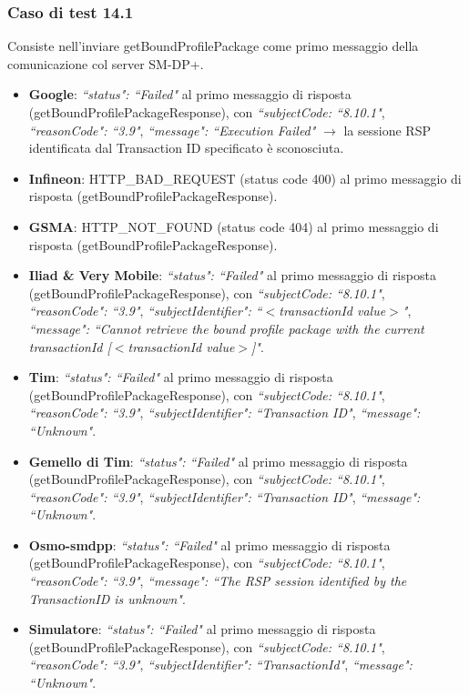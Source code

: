 \documentclass[10pt, oneside]{book}
\begin{document}
\subsubsection{Caso di test 14.1}
Consiste nell'inviare getBoundProfilePackage come primo messaggio della comunicazione col server SM-DP+.
\begin{itemize}
\item \textbf{Google}: \textit{``status": ``Failed"} al primo messaggio di risposta (getBoundProfilePackageResponse), con \textit{``subjectCode: ``8.10.1"}, \textit{``reasonCode": ``3.9"}, \textit{``message": ``Execution Failed"} $\rightarrow$ la sessione RSP identificata dal Transaction ID specificato è sconosciuta.
\item \textbf{Infineon}: HTTP\_BAD\_REQUEST (status code 400) al primo messaggio di risposta (getBoundProfilePackageResponse).
\item \textbf{GSMA}: HTTP\_NOT\_FOUND (status code 404) al primo messaggio di risposta (getBoundProfilePackageResponse).
\item \textbf{Iliad \& Very Mobile}: \textit{``status": ``Failed"} al primo messaggio di risposta (getBoundProfilePackageResponse), con \textit{``subjectCode: ``8.10.1"}, \textit{``reasonCode": ``3.9"}, \textit{``subjectIdentifier": ``$<$transactionId value$>$"}, \textit{``message": ``Cannot retrieve the bound profile package with the current transactionId [$<$transactionId value$>$]"}.
\item \textbf{Tim}: \textit{``status": ``Failed"} al primo messaggio di risposta (getBoundProfilePackageResponse), con \textit{``subjectCode: ``8.10.1"}, \textit{``reasonCode": ``3.9"}, \textit{``subjectIdentifier": ``Transaction ID"}, \textit{``message": ``Unknown"}.
\item \textbf{Gemello di Tim}: \textit{``status": ``Failed"} al primo messaggio di risposta (getBoundProfilePackageResponse), con \textit{``subjectCode: ``8.10.1"}, \textit{``reasonCode": ``3.9"}, \textit{``subjectIdentifier": ``Transaction ID"}, \textit{``message": ``Unknown"}.
\item \textbf{Osmo-smdpp}: \textit{``status": ``Failed"} al primo messaggio di risposta (getBoundProfilePackageResponse), con \textit{``subjectCode: ``8.10.1"}, \textit{``reasonCode": ``3.9"}, \textit{``message": ``The RSP session identified by the TransactionID is unknown"}.
\item \textbf{Simulatore}: \textit{``status": ``Failed"} al primo messaggio di risposta (getBoundProfilePackageResponse), con \textit{``subjectCode: ``8.10.1"}, \textit{``reasonCode": ``3.9"}, \textit{``subjectIdentifier": ``TransactionId"}, \textit{``message": ``Unknown"}.
\end{itemize}
\end{document}
